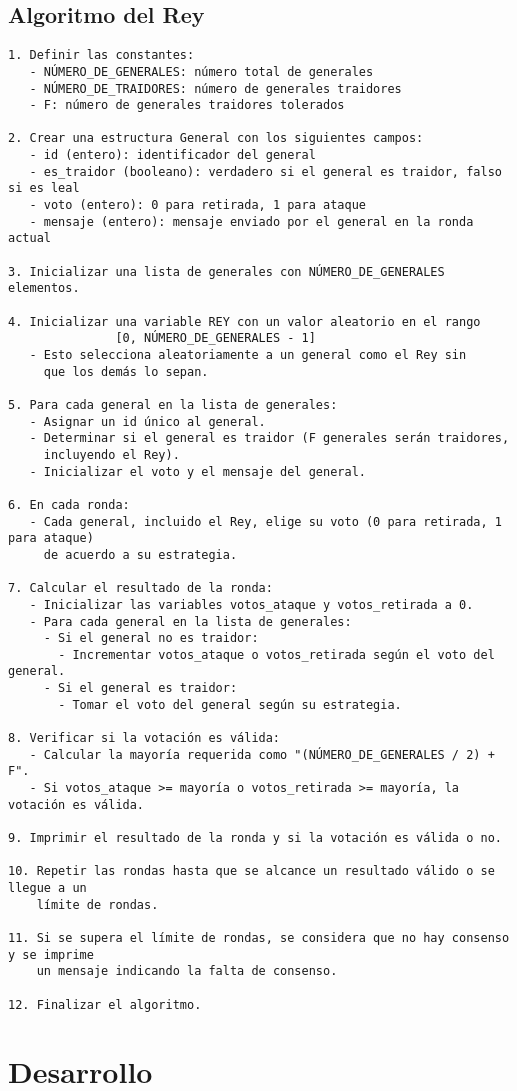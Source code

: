 \documentclass[a4paper,12pt]{article}
\begin{document}
\subsection*{Algoritmo del Rey}
\begin{verbatim}
1. Definir las constantes:
   - NÚMERO_DE_GENERALES: número total de generales
   - NÚMERO_DE_TRAIDORES: número de generales traidores
   - F: número de generales traidores tolerados

2. Crear una estructura General con los siguientes campos:
   - id (entero): identificador del general
   - es_traidor (booleano): verdadero si el general es traidor, falso si es leal
   - voto (entero): 0 para retirada, 1 para ataque
   - mensaje (entero): mensaje enviado por el general en la ronda actual

3. Inicializar una lista de generales con NÚMERO_DE_GENERALES elementos.

4. Inicializar una variable REY con un valor aleatorio en el rango
               [0, NÚMERO_DE_GENERALES - 1]
   - Esto selecciona aleatoriamente a un general como el Rey sin 
     que los demás lo sepan.

5. Para cada general en la lista de generales:
   - Asignar un id único al general.
   - Determinar si el general es traidor (F generales serán traidores,
     incluyendo el Rey).
   - Inicializar el voto y el mensaje del general.

6. En cada ronda:
   - Cada general, incluido el Rey, elige su voto (0 para retirada, 1 para ataque) 
     de acuerdo a su estrategia.

7. Calcular el resultado de la ronda:
   - Inicializar las variables votos_ataque y votos_retirada a 0.
   - Para cada general en la lista de generales:
     - Si el general no es traidor:
       - Incrementar votos_ataque o votos_retirada según el voto del general.
     - Si el general es traidor:
       - Tomar el voto del general según su estrategia.

8. Verificar si la votación es válida:
   - Calcular la mayoría requerida como "(NÚMERO_DE_GENERALES / 2) + F".
   - Si votos_ataque >= mayoría o votos_retirada >= mayoría, la votación es válida.

9. Imprimir el resultado de la ronda y si la votación es válida o no.

10. Repetir las rondas hasta que se alcance un resultado válido o se llegue a un 
    límite de rondas.

11. Si se supera el límite de rondas, se considera que no hay consenso y se imprime
    un mensaje indicando la falta de consenso.

12. Finalizar el algoritmo.

\end{verbatim}



\section*{Desarrollo}
\end{document}
